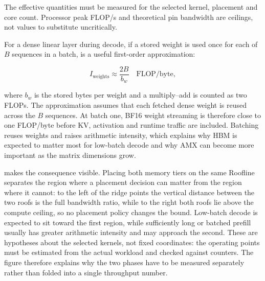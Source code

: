 The effective quantities must be measured for the selected kernel,
placement and core count.  Processor peak FLOP/s and theoretical pin
bandwidth are ceilings, not values to substitute uncritically.

For a dense linear layer during decode, if a stored weight is used once
for each of \(B\) sequences in a batch,  is a
useful first-order approximation:

\begin{equation}
\label{eq:intensity}
  I_{\mathrm{weights}} \approx \frac{2B}{b_w}
  \quad \text{FLOP/byte},
\end{equation}

where \(b_w\) is the stored bytes per weight and a multiply--add is
counted as two FLOPs.  The approximation assumes that each fetched dense
weight is reused across the \(B\) sequences.  At batch one, BF16 weight
streaming is therefore close to one FLOP/byte before KV,
activation and runtime traffic are included.  Batching reuses weights
and raises arithmetic intensity, which explains why HBM is expected to
matter most for low-batch decode and why AMX can become more important
as the matrix dimensions grow.

 makes the consequence visible.  Placing both
memory tiers on the same Roofline separates the region where a placement
decision can matter from the region where it cannot: to the left of the
ridge points the vertical distance between the two roofs is the full
bandwidth ratio, while to the right both roofs lie above the compute
ceiling, so no placement policy changes the bound.  Low-batch decode is
expected to sit toward the first region, while sufficiently long or
batched prefill usually has greater arithmetic intensity and may approach
the second.  These are hypotheses about the selected kernels, not fixed
coordinates: the operating points must be estimated from the actual
workload and checked against counters.  The figure therefore explains
why the two phases have to be measured separately rather than folded into
a single throughput number.

